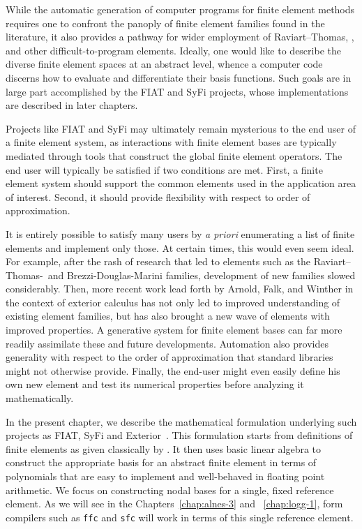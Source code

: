 While the automatic generation of computer programs for finite element
methods requires one to confront the panoply of finite element families
found in the literature, it also provides a pathway for wider employment
of Raviart--Thomas, \nedelec, and other difficult-to-program elements.
Ideally, one would like to describe the diverse finite element spaces
at an abstract level, whence a computer code discerns how to evaluate
and differentiate their basis functions.  Such goals are in large part
accomplished by the FIAT and SyFi projects, whose implementations are
described in later chapters.

Projects like FIAT and SyFi may ultimately remain mysterious to the end
user of a finite element system, as interactions with finite element
bases are typically mediated through tools that construct the global
finite element operators.  The end user will typically be satisfied if
two conditions are met.  First, a finite element system should support
the common elements used in the application area of interest.  Second,
it should provide flexibility with respect to order of approximation.

It is entirely possible to satisfy many users by \emph{a priori}
enumerating a list of finite elements and implement only those.
At certain times, this would even seem ideal.  For example, after the rash
of research that led to elements such as the Raviart--Thomas-\nedelec\
and Brezzi-Douglas-Marini families, development of new families
slowed considerably.  Then, more recent work lead forth by Arnold,
Falk, and Winther in the context of exterior calculus has not only led
to improved understanding of existing element families, but has also
brought a new wave of elements with improved properties.  A generative
system for finite element bases can far more readily assimilate these
and future developments.  Automation also provides generality with
respect to the order of approximation that standard libraries might
not otherwise provide. Finally, the end-user might even easily define
his own new element and test its numerical properties before analyzing
it mathematically.

In the present chapter, we describe the mathematical
formulation underlying such projects as FIAT, SyFi and
Exterior~\citep{LoggMardal2009}.  This formulation starts from definitions
of finite elements as given classically by \citet{Ciarlet2002}.
It then uses basic linear algebra to construct the appropriate basis
for an abstract finite element in terms of polynomials that are easy to
implement and well-behaved in floating point arithmetic.  We focus on
constructing nodal bases for a single, fixed reference element.  As we
will see in the Chapters~\ref{chap:alnes-3} and ~\ref{chap:logg-1},
form compilers such as \texttt{ffc} and \texttt{sfc} will work in terms
of this single reference element.

